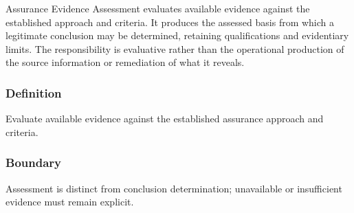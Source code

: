 Assurance Evidence Assessment evaluates available evidence against the established approach and criteria. It produces the assessed basis from which a legitimate conclusion may be determined, retaining qualifications and evidentiary limits. The responsibility is evaluative rather than the operational production of the source information or remediation of what it reveals.

\subsubsection*{Definition}

Evaluate available evidence against the established assurance approach and criteria.

\subsubsection*{Boundary}

Assessment is distinct from conclusion determination; unavailable or insufficient evidence must remain explicit.

